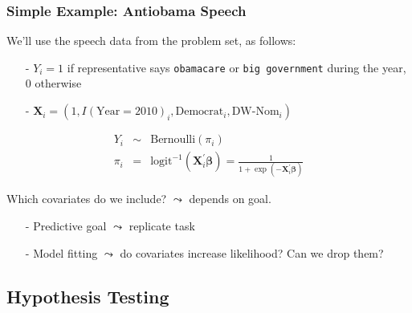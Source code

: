 \documentclass{beamer}
\begin{document}
\begin{frame}
\frametitle{Simple Example: Antiobama Speech}

We'll  use the speech data from the problem set, as follows:

\begin{itemize}
\item[-] $Y_{i} = 1 $ if representative says {\tt obamacare} or {\tt big government} during the year, 0 otherwise
\item[-] $\boldsymbol{X}_{i} = (1, I(\text{Year} = 2010)_{i}, \text{Democrat}_{i}, \text{DW-Nom}_{i}) $
\end{itemize}

\begin{eqnarray}
Y_{i}  &  \sim &   \text{Bernoulli}(\pi_{i}) \nonumber \\
\pi_{i}     & = & \text{logit}^{-1}(\boldsymbol{X}_{i}^{'} \boldsymbol{\beta})  = \frac{1}{1 + \exp(-\boldsymbol{X}_{i}^{'} \boldsymbol{\beta}) } \nonumber
\end{eqnarray}


Which covariates do we include? $\leadsto$ depends on goal.  \\
\begin{itemize}
\item[-] Predictive goal $\leadsto$ replicate task
\item[-] Model fitting $\leadsto$ do covariates increase likelihood? Can we drop them?
\end{itemize}

\end{frame}




\subsection{Hypothesis Testing}
\end{document}
